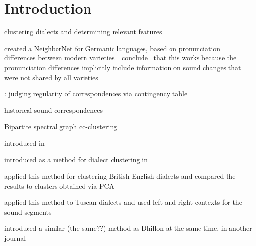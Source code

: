 \documentclass[a4paper]{article}
\begin{document}
\newpage
\tableofcontents
\newpage
\listoftables
\listoffigures
\newpage



\section{Introduction}


clustering dialects and determining relevant features

\citet{prokic2012detecting}


\citet{heggarty2010splits} created a NeighborNet for Germanic languages, based on pronunciation differences between modern varieties. 
~conclude~ that this works because the pronunciation differences implicitly include information on sound changes that were not shared by all varieties

\citet{prokic2013combining}: judging regularity of correspondences via contingency table


historical sound correspondences



Bipartite spectral graph co-clustering

introduced in \citet{dhillon2001co-clustering}

introduced as a method for dialect clustering in \citet{wieling2011bipartite}

\citet{wieling2013analyzing} applied this method for clustering British English dialects and compared the results to clusters obtained via PCA
 
\citet{montemagni2013synchronic} applied this method to Tuscan dialects and used left and right contexts for the sound segments

\citet{zha2001bipartite} introduced a similar (the same??) method as Dhillon at the same time, in another journal

\end{document}
